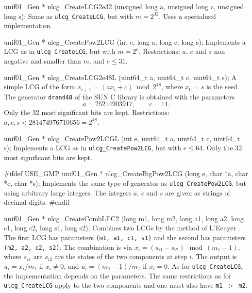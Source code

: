 unif01_Gen * ulcg_CreateLCG2e32 (unsigned long a, unsigned long c,
                                 unsigned long s);
\endcode
  \tab  Same as {\tt ulcg\_CreateLCG}, but with
   $m=2^{32}$.  Uses a specialized implementation.
  \endtab
\code


unif01_Gen * ulcg_CreatePow2LCG (int e, long a, long c, long s);
\endcode
  \tab  Implements a LCG as in  {\tt ulcg\_CreateLCG}, but with $m = 2^e$.
   Restrictions: $a$, $c$ and $s$ non negative and smaller than $m$,
   and $e \le 31$.
  \endtab
\code


unif01_Gen * ulcg_CreateLCG2e48L (uint64_t a, uint64_t c, uint64_t s);
\endcode
  \tab A simple LCG of the form $x_{i+1} = (ax_i +c) \bmod 2^{48}$, where
  $x_0 = s$ is the seed.
%
  The generator  {\tt drand48} of the SUN
  C library is obtained with the parameters
   $$
     a = 25214903917, \qquad c = 11.
   $$
   Only the 32 most significant bits are kept.
   Restrictions: $a, c, s < 281474976710656 = 2^{48}$.
  \endtab
\code


unif01_Gen * ulcg_CreatePow2LCGL (int e, uint64_t a, uint64_t c,
                                  uint64_t s);
\endcode
  \tab  Implements a LCG as in  {\tt ulcg\_CreatePow2LCG}, but with
   $e \le 64$.   Only the 32 most significant bits are kept.
  \endtab
\code


#ifdef USE_GMP
unif01_Gen * ulcg_CreateBigPow2LCG (long e, char *a, char *c, char *s);
\endcode
  \tab  Implements the same type of generator as {\tt ulcg\_CreatePow2LCG},
   but using arbitrary large integers. The integers $a$, $c$ and $s$ are
   given as strings of decimal digits.
  \endtab
\code
#endif
\endcode



\code

unif01_Gen * ulcg_CreateCombLEC2 (long m1, long m2, long a1, long a2,
                                  long c1, long c2, long s1, long s2);
\endcode
 \tab  Combines two LCGs by the method of L'Ecuyer \cite{rLEC88a}.
   The first LCG has parameters {\tt (m1, a1, c1, s1)} and the
   second has parameters {\tt (m2, a2, c2, s2)}.
%
   The combination is via $x_i = (s_{i1} - s_{i2}) \mod (m_1-1)$,
   where $s_{i1}$ are $s_{i2}$ are the states of the two components
   at step $i$.
   The output is $u_i = x_i/m_1$ if $x_i\not=0$, and
   $u_i = (m_1-1)/m_1$ if $x_i=0$.
   As for {\tt ulcg\_CreateLCG}, the implementation depends on the parameters.
   The same restrictions as for {\tt ulcg\_CreateLCG} apply to the two components
   and one must also have {\tt m1 $>$ m2}.
  \endtab
\code


